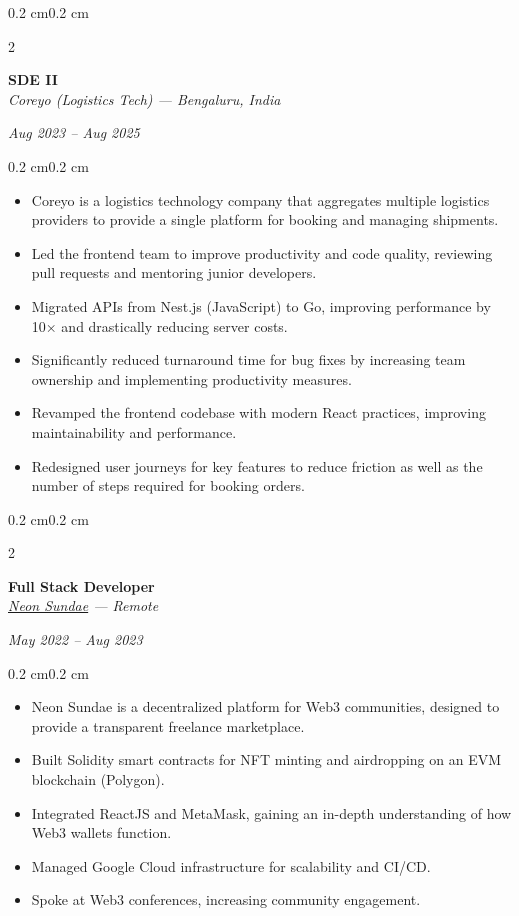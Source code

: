 \documentclass[10pt, letterpaper]{article}
\newenvironment{highlights}{
    \begin{itemize}[
        topsep=0.10 cm,
        parsep=0.10 cm,
        partopsep=0pt,
        itemsep=0pt,
        leftmargin=0.5 cm
    ]
}{
    \end{itemize}
}
\newenvironment{onecolentry}{
    \begin{adjustwidth}{0.2 cm}{0.2 cm}
}{
    \end{adjustwidth}
}
\newenvironment{twocolentry}[2][]{
    \onecolentry
    \def\secondColumn{#2}
    \setcolumnwidth{\fill, 4.5 cm}
    \begin{paracol}{2}
}{
    \switchcolumn \raggedleft \secondColumn
    \end{paracol}
    \endonecolentry
}
\begin{document}
\begin{twocolentry}{\textit{Aug 2023 -- Aug 2025}}
    \textbf{SDE II} \\
    \textit{Coreyo (Logistics Tech) — Bengaluru, India}
\end{twocolentry}
\begin{onecolentry}
\begin{highlights}
    \item Coreyo is a logistics technology company that aggregates multiple logistics providers to provide a single platform for booking and managing shipments.
    \item Led the frontend team to improve productivity and code quality, reviewing pull requests and mentoring junior developers.
    \item Migrated APIs from Nest.js (JavaScript) to Go, improving performance by 10× and drastically reducing server costs.
    \item Significantly reduced turnaround time for bug fixes by increasing team ownership and implementing productivity measures.
    \item Revamped the frontend codebase with modern React practices, improving maintainability and performance.
    \item Redesigned user journeys for key features to reduce friction as well as the number of steps required for booking orders.
\end{highlights}
\end{onecolentry}

\vspace{0.2cm}

\begin{twocolentry}{\textit{May 2022 -- Aug 2023}}
    \textbf{Full Stack Developer} \\
    \textit{\href{https://app.neonsundae.xyz/}{Neon Sundae} — Remote}
\end{twocolentry}
\begin{onecolentry}
\begin{highlights}
    \item Neon Sundae is a decentralized platform for Web3 communities, designed to provide a transparent freelance marketplace.
    \item Built Solidity smart contracts for NFT minting and airdropping on an EVM blockchain (Polygon).
    \item Integrated ReactJS and MetaMask, gaining an in-depth understanding of how Web3 wallets function.
    \item Managed Google Cloud infrastructure for scalability and CI/CD.
    \item Spoke at Web3 conferences, increasing community engagement.
\end{highlights}
\end{onecolentry}
\end{document}
